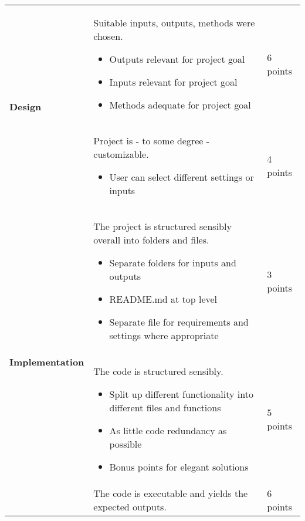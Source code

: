 \documentclass[a4paper,12pt]{report}
\begin{document}
\begin{center}
\begin{tabular}{ | m{} | m{}| m{} | } 
  \hline
  \multirow{2}{4em}{\textbf{Design}} & \vspace{4mm} Suitable inputs, outputs, methods were chosen.
  \begin{itemize}
    \item Outputs relevant for project goal
    \item Inputs relevant for project goal
    \item Methods adequate for project goal
  \end{itemize}
  & 6 points \\ 
  \cline{2-3}
  & \vspace{4mm} Project is - to some degree - customizable.
  \begin{itemize}
    \item User can select different settings or inputs
  \end{itemize}
  & 4 points \\ 
  \hline
  \multirow{4}{4em}{\textbf{Implementation}} & \vspace{4mm} The project is structured sensibly overall into folders and files. 
  \begin{itemize}
    \item Separate folders for inputs and outputs
    \item README.md at top level
    \item Separate file for requirements and settings where appropriate
  \end{itemize}
  & 3 points \\ 
  \cline{2-3}
  & \vspace{4mm} The code is structured sensibly.
  \begin{itemize}
    \item Split up different functionality into different files and functions
    \item As little code redundancy as possible
    \item Bonus points for elegant solutions
  \end{itemize}
  & 5 points \\
  \cline{2-3}
  & \vspace{4mm} The code is executable and yields the expected outputs. \vspace{3mm}
  & 6 points \\
  \hline  

\end{tabular}
\end{center}
\end{document}
